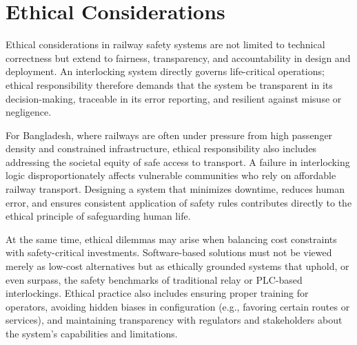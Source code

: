 \section{Ethical Considerations}
\label{sec:outro:ethics}

Ethical considerations in railway safety systems are not limited to technical correctness but extend to fairness, transparency, and accountability in design and deployment. An interlocking system directly governs life-critical operations; ethical responsibility therefore demands that the system be transparent in its decision-making, traceable in its error reporting, and resilient against misuse or negligence.

For Bangladesh, where railways are often under pressure from high passenger density and constrained infrastructure, ethical responsibility also includes addressing the societal equity of safe access to transport. A failure in interlocking logic disproportionately affects vulnerable communities who rely on affordable railway transport. Designing a system that minimizes downtime, reduces human error, and ensures consistent application of safety rules contributes directly to the ethical principle of safeguarding human life.

At the same time, ethical dilemmas may arise when balancing cost constraints with safety-critical investments. Software-based solutions must not be viewed merely as low-cost alternatives but as ethically grounded systems that uphold, or even surpass, the safety benchmarks of traditional relay or PLC-based interlockings. Ethical practice also includes ensuring proper training for operators, avoiding hidden biases in configuration (e.g., favoring certain routes or services), and maintaining transparency with regulators and stakeholders about the system’s capabilities and limitations.